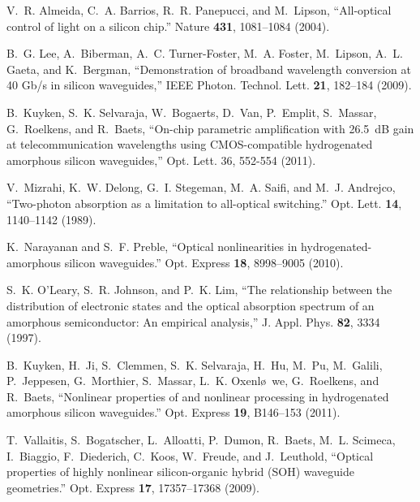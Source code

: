 \documentclass[10pt,letterpaper]{article}
\begin{document}
%
%

\begin{thebibliography}{10}
\newcommand{\enquote}[1]{``#1''}

V.~R. Almeida, C.~A. Barrios, R.~R. Panepucci, and M.~Lipson,
  \enquote{{All-optical control of light on a silicon chip.}} Nature
  \textbf{431}, 1081--1084 (2004).

B.~G. Lee, A.~Biberman, A.~C. Turner-Foster, M.~A. Foster, M.~Lipson, A.~L.
  Gaeta, and K.~Bergman, \enquote{{Demonstration of broadband wavelength
  conversion at 40 Gb/s in silicon waveguides},} IEEE Photon. Technol. Lett. \textbf{21}, 182--184 (2009).

B.~Kuyken, S.~K. Selvaraja, W.~Bogaerts, D.~Van, P.~Emplit, S.~Massar,
  G.~Roelkens, and R.~Baets, \enquote{{On-chip parametric amplification with 26.5~dB gain at telecommunication wavelengths using CMOS-compatible hydrogenated amorphous silicon waveguides},} Opt. Lett.  36, 552-554 (2011).

V.~Mizrahi, K.~W. Delong, G.~I. Stegeman, M.~A. Saifi, and M.~J. Andrejco,
  \enquote{{Two-photon absorption as a limitation to all-optical switching.}}
  Opt. Lett. \textbf{14}, 1140--1142 (1989).

K.~Narayanan and S.~F. Preble, \enquote{{Optical nonlinearities in
  hydrogenated-amorphous silicon waveguides.}} Opt. Express \textbf{18},
  8998--9005 (2010).

S.~K. O’Leary, S.~R. Johnson, and P.~K. Lim, \enquote{{The relationship
  between the distribution of electronic states and the optical absorption
  spectrum of an amorphous semiconductor: An empirical analysis},} J. Appl. Phys. \textbf{82}, 3334 (1997).

B.~Kuyken, H.~Ji, S.~Clemmen, S.~K. Selvaraja, H.~Hu, M.~Pu, M.~Galili,
  P.~Jeppesen, G.~Morthier, S.~Massar, L.~K. Oxenl\o~we, G.~Roelkens, and
  R.~Baets, \enquote{{Nonlinear properties of and nonlinear processing in
  hydrogenated amorphous silicon waveguides.}} Opt. Express \textbf{19},
  B146--153 (2011).

T.~Vallaitis, S.~Bogatscher, L.~Alloatti, P.~Dumon, R.~Baets, M.~L. Scimeca,
  I.~Biaggio, F.~Diederich, C.~Koos, W.~Freude, and J.~Leuthold,
  \enquote{{Optical properties of highly nonlinear silicon-organic hybrid (SOH)
  waveguide geometries.}} Opt. Express \textbf{17}, 17357--17368 (2009).


\end{thebibliography}
\end{document}

